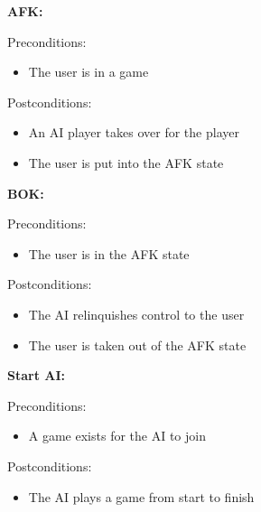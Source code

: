 \documentclass[12pt]{article}
\begin{document}
\begin{description}
\item
\begin{description}
	\item \textbf{AFK:}
	\item Preconditions:
		\begin{itemize}
		\item The user is in a game
		\end{itemize}	
	\item Postconditions:
		\begin{itemize}
		\item An AI player takes over for the player
		\item The user is put into the AFK state
		\end{itemize}
\end{description}

\item
\begin{description}
	\item \textbf{BOK:}
	\item Preconditions:
		\begin{itemize}
		\item The user is in the AFK state
		\end{itemize}	
	\item Postconditions:
		\begin{itemize}
		\item The AI relinquishes control to the user
		\item The user is taken out of the AFK state
		\end{itemize}
\end{description}


\item
\begin{description}
	\item \textbf{Start AI:}
	\item Preconditions:
		\begin{itemize}
		\item A game exists for the AI to join
		\end{itemize}	
	\item Postconditions:
		\begin{itemize}
		\item The AI plays a game from start to finish
		\end{itemize}
\end{description}


\end{description}
\end{document}
